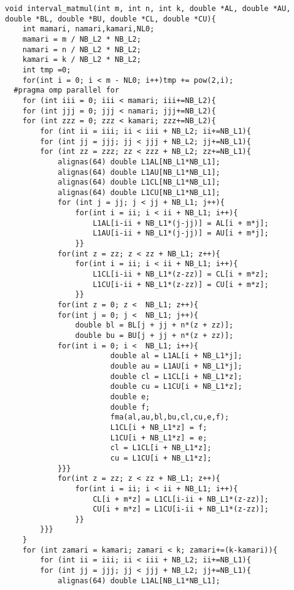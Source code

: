 \documentclass[11pt,a4paper]{jsreport}
\theoremstyle{definition}
\begin{document}
\begin{lstlisting}[caption = 本研究で使用したプログラム]
void interval_matmul(int m, int n, int k, double *AL, double *AU, double *BL, double *BU, double *CL, double *CU){
    int mamari, namari,kamari,NL0;
    mamari = m / NB_L2 * NB_L2;
    namari = n / NB_L2 * NB_L2;
    kamari = k / NB_L2 * NB_L2;
    int tmp =0;
    for(int i = 0; i < m - NL0; i++)tmp += pow(2,i);
  #pragma omp parallel for
    for (int iii = 0; iii < mamari; iii+=NB_L2){
    for (int jjj = 0; jjj < namari; jjj+=NB_L2){
    for (int zzz = 0; zzz < kamari; zzz+=NB_L2){
        for (int ii = iii; ii < iii + NB_L2; ii+=NB_L1){
        for (int jj = jjj; jj < jjj + NB_L2; jj+=NB_L1){
        for (int zz = zzz; zz < zzz + NB_L2; zz+=NB_L1){
            alignas(64) double L1AL[NB_L1*NB_L1];
            alignas(64) double L1AU[NB_L1*NB_L1];
            alignas(64) double L1CL[NB_L1*NB_L1];
            alignas(64) double L1CU[NB_L1*NB_L1];
            for (int j = jj; j < jj + NB_L1; j++){
                for(int i = ii; i < ii + NB_L1; i++){
                    L1AL[i-ii + NB_L1*(j-jj)] = AL[i + m*j];
                    L1AU[i-ii + NB_L1*(j-jj)] = AU[i + m*j];
                }}
            for(int z = zz; z < zz + NB_L1; z++){
                for(int i = ii; i < ii + NB_L1; i++){
                    L1CL[i-ii + NB_L1*(z-zz)] = CL[i + m*z];
                    L1CU[i-ii + NB_L1*(z-zz)] = CU[i + m*z];
                }}
            for(int z = 0; z <  NB_L1; z++){
            for(int j = 0; j <  NB_L1; j++){
                double bl = BL[j + jj + n*(z + zz)];
                double bu = BU[j + jj + n*(z + zz)];
            for(int i = 0; i <  NB_L1; i++){
                        double al = L1AL[i + NB_L1*j];
                        double au = L1AU[i + NB_L1*j];
                        double cl = L1CL[i + NB_L1*z];
                        double cu = L1CU[i + NB_L1*z];
                        double e;
                        double f;
                        fma(al,au,bl,bu,cl,cu,e,f);
                        L1CL[i + NB_L1*z] = f;
                        L1CU[i + NB_L1*z] = e;
                        cl = L1CL[i + NB_L1*z];
                        cu = L1CU[i + NB_L1*z];
            }}}
            for(int z = zz; z < zz + NB_L1; z++){
                for(int i = ii; i < ii + NB_L1; i++){
                    CL[i + m*z] = L1CL[i-ii + NB_L1*(z-zz)];
                    CU[i + m*z] = L1CU[i-ii + NB_L1*(z-zz)];
                }}
        }}}
    }
    for (int zamari = kamari; zamari < k; zamari+=(k-kamari)){
        for (int ii = iii; ii < iii + NB_L2; ii+=NB_L1){
        for (int jj = jjj; jj < jjj + NB_L2; jj+=NB_L1){
            alignas(64) double L1AL[NB_L1*NB_L1];

\end{lstlisting}
\end{document}
